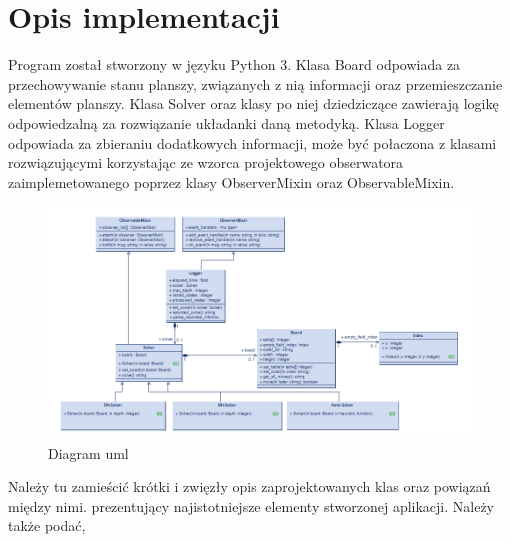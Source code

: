 \documentclass{classrep}
\begin{document}
{    }\label{sec:wprowadzenie}

    \section{Opis implementacji}
    {
        Program został stworzony w języku Python 3.
        Klasa Board odpowiada za przechowywanie stanu planszy, związanych z nią informacji oraz
    przemieszczanie elementów planszy.
    Klasa Solver oraz klasy po niej dziedziczące zawierają logikę odpowiedzalną za rozwiązanie układanki daną metodyką.
    Klasa Logger odpowiada za zbieraniu dodatkowych informacji, może być połaczona z klasami rozwiązującymi
    korzystając ze wzorca projektowego obserwatora zaimplemetowanego poprzez klasy ObserverMixin oraz ObservableMixin.


        \begin{figure}
            \centering
            \includegraphics[width=\textwidth,height=\textheight,keepaspectratio]{diagram}
            \caption{Diagram uml}
            \label{fig:Diagram uml}
        \end{figure}


        Należy tu zamieścić krótki i zwięzły opis zaprojektowanych klas oraz powiązań
        między nimi.
        prezentujący najistotniejsze elementy stworzonej aplikacji. Należy także podać,




    }\label{sec:opis-implementacji}
\end{document}
